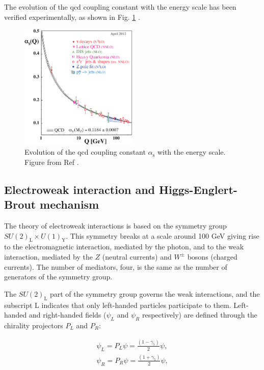 The evolution of the \gls{qcd} coupling constant with the energy scale has been verified experimentally, as shown in Fig. \ref{fig:sm:alphas} \cite{Bethke:2012jm}.

\begin{figure}[ht]
\centering
\includegraphics[width=0.5\textwidth]{figures/theory/asq-2011}
\caption{Evolution of the \gls{qcd} coupling constant $\alpha_\mathrm{s}$ with the energy scale. Figure from Ref \cite{Bethke:2012jm}.}
\label{fig:sm:alphas}
\end{figure}

\subsection{Electroweak interaction and Higgs-Englert-Brout mechanism}
\label{sec:smsusy:ew}

The theory of electroweak interactions is based on the symmetry group $SU(2)_\mathrm{L} \times U(1)_\mathrm{Y}$. This symmetry breaks at a scale around 100 GeV giving rise to the electromagnetic interaction, mediated by the photon, and to the weak interaction, mediated by the $Z$ (neutral currents) and $W^{\pm}$ bosons (charged currents). The number of mediators, four, is the same as the number of generators of the symmetry group. 

The $SU(2)_\mathrm{L}$ part of the symmetry group governs the weak interactions, and the subscript L indicates that only left-handed particles participate to them. Left-handed and right-handed fields ($\psi_L$ and $\psi_R$ respectively) are defined through the chirality projectors $P_L$ and $P_R$:

\begin{equation}
\begin{aligned}
\psi_L = P_L \psi = \frac{(1 - \gamma_5)}{2} \psi, \\
\psi_R = P_R \psi = \frac{(1 + \gamma_5)}{2} \psi,
\end{aligned}
\label{eq:sm:LR}
\end{equation}

